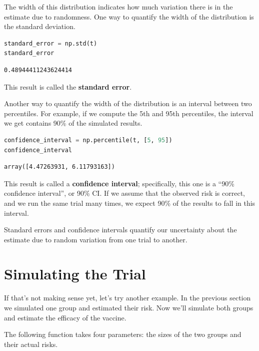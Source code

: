 The width of this distribution indicates how much variation there is in
the estimate due to randomness. One way to quantify the width of the
distribution is the standard deviation.

\begin{lstlisting}[language=Python,style=source]
standard_error = np.std(t)
standard_error
\end{lstlisting}

\begin{lstlisting}[style=output]
0.48944411243624414
\end{lstlisting}

This result is called the \textbf{standard error}.

Another way to quantify the width of the distribution is an interval
between two percentiles. For example, if we compute the 5th and 95th
percentiles, the interval we get contains 90\% of the simulated results.

\begin{lstlisting}[language=Python,style=source]
confidence_interval = np.percentile(t, [5, 95])
confidence_interval
\end{lstlisting}

\begin{lstlisting}[style=output]
array([4.47263931, 6.11793163])
\end{lstlisting}

This result is called a \textbf{confidence interval}; specifically, this
one is a ``90\% confidence interval'', or 90\% CI. If we assume that the
observed risk is correct, and we run the same trial many times, we
expect 90\% of the results to fall in this interval.

Standard errors and confidence intervals quantify our uncertainty about
the estimate due to random variation from one trial to another.

\hypertarget{simulating-the-trial}{%
\section{Simulating the Trial}\label{simulating-the-trial}}

If that's not making sense yet, let's try another example. In the
previous section we simulated one group and estimated their risk. Now
we'll simulate both groups and estimate the efficacy of the vaccine.

The following function takes four parameters: the sizes of the two
groups and their actual risks.

